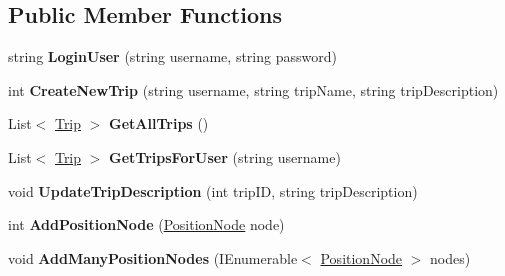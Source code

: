 \subsection*{Public Member Functions}
\begin{DoxyCompactItemize}
\item 
\hypertarget{interface_tripi_w_c_f_1_1_service_1_1_i_trip_service_ad23ee6719b3640fd1c990cd9f32acfbe}{
string {\bfseries LoginUser} (string username, string password)}
\label{interface_tripi_w_c_f_1_1_service_1_1_i_trip_service_ad23ee6719b3640fd1c990cd9f32acfbe}

\item 
\hypertarget{interface_tripi_w_c_f_1_1_service_1_1_i_trip_service_a10edfa62941be7cbb3ccc1421df39b09}{
int {\bfseries CreateNewTrip} (string username, string tripName, string tripDescription)}
\label{interface_tripi_w_c_f_1_1_service_1_1_i_trip_service_a10edfa62941be7cbb3ccc1421df39b09}

\item 
\hypertarget{interface_tripi_w_c_f_1_1_service_1_1_i_trip_service_aa439088421f449f59f727144f01efce0}{
List$<$ \hyperlink{class_tripi_w_c_f_1_1_service_1_1_trip}{Trip} $>$ {\bfseries GetAllTrips} ()}
\label{interface_tripi_w_c_f_1_1_service_1_1_i_trip_service_aa439088421f449f59f727144f01efce0}

\item 
\hypertarget{interface_tripi_w_c_f_1_1_service_1_1_i_trip_service_a375a6a0f21f41ddd27c83c0c03a79123}{
List$<$ \hyperlink{class_tripi_w_c_f_1_1_service_1_1_trip}{Trip} $>$ {\bfseries GetTripsForUser} (string username)}
\label{interface_tripi_w_c_f_1_1_service_1_1_i_trip_service_a375a6a0f21f41ddd27c83c0c03a79123}

\item 
\hypertarget{interface_tripi_w_c_f_1_1_service_1_1_i_trip_service_a0fdff13a8d29246186a265dfe6ce9495}{
void {\bfseries UpdateTripDescription} (int tripID, string tripDescription)}
\label{interface_tripi_w_c_f_1_1_service_1_1_i_trip_service_a0fdff13a8d29246186a265dfe6ce9495}

\item 
\hypertarget{interface_tripi_w_c_f_1_1_service_1_1_i_trip_service_a76e4011633f1beef608e26242b35ef8a}{
int {\bfseries AddPositionNode} (\hyperlink{class_tripi_w_c_f_1_1_service_1_1_position_node}{PositionNode} node)}
\label{interface_tripi_w_c_f_1_1_service_1_1_i_trip_service_a76e4011633f1beef608e26242b35ef8a}

\item 
\hypertarget{interface_tripi_w_c_f_1_1_service_1_1_i_trip_service_aa0fc9b8a507d2844fde7e51a120e4a6e}{
void {\bfseries AddManyPositionNodes} (IEnumerable$<$ \hyperlink{class_tripi_w_c_f_1_1_service_1_1_position_node}{PositionNode} $>$ nodes)}
\label{interface_tripi_w_c_f_1_1_service_1_1_i_trip_service_aa0fc9b8a507d2844fde7e51a120e4a6e}


\end{DoxyCompactItemize}
